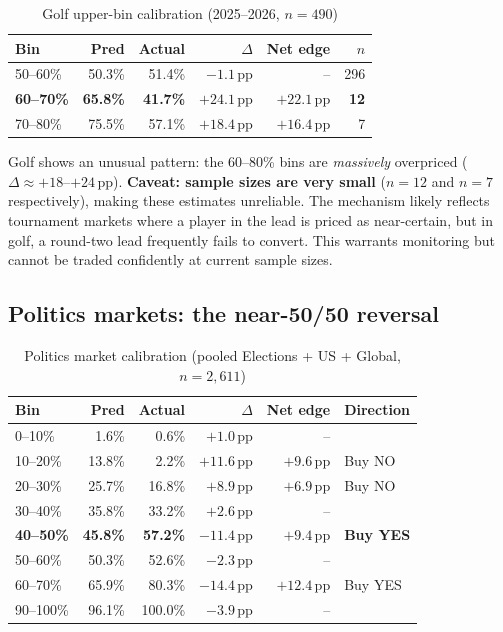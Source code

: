 \documentclass[11pt,a4paper]{article}
\begin{document}
\begin{table}[H]
\centering
\caption{Golf upper-bin calibration (2025--2026, $n=490$)}
\label{tab:golf}
\small
\begin{tabular}{lrrrrr}
\toprule
Bin & Pred & Actual & $\Delta$ & Net edge & $n$ \\
\midrule
50--60\% & 50.3\% & 51.4\% & $-1.1\,\mathrm{pp}$ & -- & 296 \\
\textbf{60--70\%} & \textbf{65.8\%} & \textbf{41.7\%} & $\mathbf{+24.1\,\mathrm{pp}}$ & $\mathbf{+22.1\,\mathrm{pp}}$ & \textbf{12} \\
70--80\% & 75.5\% & 57.1\% & $+18.4\,\mathrm{pp}$ & $+16.4\,\mathrm{pp}$ & 7 \\
\bottomrule
\end{tabular}
\end{table}

Golf shows an unusual pattern: the 60--80\% bins are \emph{massively} overpriced
($\Delta \approx +18$--$+24\,\mathrm{pp}$).
\textbf{Caveat: sample sizes are very small} ($n=12$ and $n=7$ respectively),
making these estimates unreliable.
The mechanism likely reflects tournament markets where a player in the lead is
priced as near-certain, but in golf, a round-two lead frequently fails to convert.
This warrants monitoring but cannot be traded confidently at current sample sizes.

\subsection{Politics markets: the near-50/50 reversal}

\begin{table}[H]
\centering
\caption{Politics market calibration (pooled Elections + US + Global, $n=2{,}611$)}
\label{tab:politics}
\small
\begin{tabular}{lrrrrl}
\toprule
Bin & Pred & Actual & $\Delta$ & Net edge & Direction \\
\midrule
0--10\%  & 1.6\% & 0.6\% & $+1.0\,\mathrm{pp}$ & -- & \\
10--20\% & 13.8\% & 2.2\% & $+11.6\,\mathrm{pp}$ & $+9.6\,\mathrm{pp}$ & Buy NO \\
20--30\% & 25.7\% & 16.8\% & $+8.9\,\mathrm{pp}$ & $+6.9\,\mathrm{pp}$ & Buy NO \\
30--40\% & 35.8\% & 33.2\% & $+2.6\,\mathrm{pp}$ & -- & \\
\textbf{40--50\%} & \textbf{45.8\%} & \textbf{57.2\%} & $\mathbf{-11.4\,\mathrm{pp}}$ & $\mathbf{+9.4\,\mathrm{pp}}$ & \textbf{Buy YES} \\
50--60\% & 50.3\% & 52.6\% & $-2.3\,\mathrm{pp}$ & -- & \\
60--70\% & 65.9\% & 80.3\% & $-14.4\,\mathrm{pp}$ & $+12.4\,\mathrm{pp}$ & Buy YES \\
90--100\%& 96.1\% & 100.0\% & $-3.9\,\mathrm{pp}$ & -- & \\
\bottomrule
\end{tabular}
\end{table}
\end{document}
